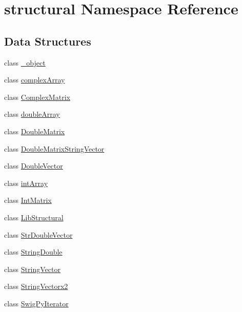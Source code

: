 \hypertarget{namespacestructural}{}\section{structural Namespace Reference}
\label{namespacestructural}
\subsection*{Data Structures}
\begin{DoxyCompactItemize}
\item 
class \hyperlink{classstructural_1_1__object}{\+\_\+object}
\item 
class \hyperlink{classstructural_1_1complex_array}{complex\+Array}
\item 
class \hyperlink{classstructural_1_1_complex_matrix}{Complex\+Matrix}
\item 
class \hyperlink{classstructural_1_1double_array}{double\+Array}
\item 
class \hyperlink{classstructural_1_1_double_matrix}{Double\+Matrix}
\item 
class \hyperlink{classstructural_1_1_double_matrix_string_vector}{Double\+Matrix\+String\+Vector}
\item 
class \hyperlink{classstructural_1_1_double_vector}{Double\+Vector}
\item 
class \hyperlink{classstructural_1_1int_array}{int\+Array}
\item 
class \hyperlink{classstructural_1_1_int_matrix}{Int\+Matrix}
\item 
class \hyperlink{classstructural_1_1_lib_structural}{Lib\+Structural}
\item 
class \hyperlink{classstructural_1_1_str_double_vector}{Str\+Double\+Vector}
\item 
class \hyperlink{classstructural_1_1_string_double}{String\+Double}
\item 
class \hyperlink{classstructural_1_1_string_vector}{String\+Vector}
\item 
class \hyperlink{classstructural_1_1_string_vectorx2}{String\+Vectorx2}
\item 
class \hyperlink{classstructural_1_1_swig_py_iterator}{Swig\+Py\+Iterator}
\end{DoxyCompactItemize}
